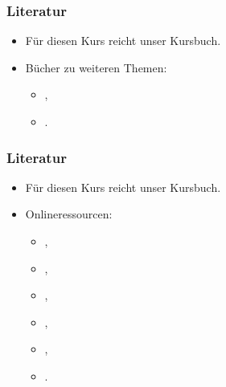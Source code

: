 \documentclass[aspectratio=169,mathserif,notheorems]{beamer}%
\begin{document}
%
\begin{frame}[t]\frametitle{Literatur}%
\begin{itemize}%
\item Für diesen Kurs reicht unser Kursbuch\cite{programmingWithPython}.%
\item Bücher zu weiteren Themen:\begin{itemize}%
\item {},%
\item {}.%
\end{itemize}%
\end{itemize}%
\end{frame}%
%
\begin{frame}[t]\frametitle{Literatur}%
\begin{itemize}%
\item Für diesen Kurs reicht unser Kursbuch\cite{programmingWithPython}.%
\item Onlineressourcen:\begin{itemize}%
\item {},
\item {},%
\item {},%
\item {},%
\item {},%
\item {}.%
\end{itemize}%
\end{itemize}%
\end{frame}%
%
\end{document}
